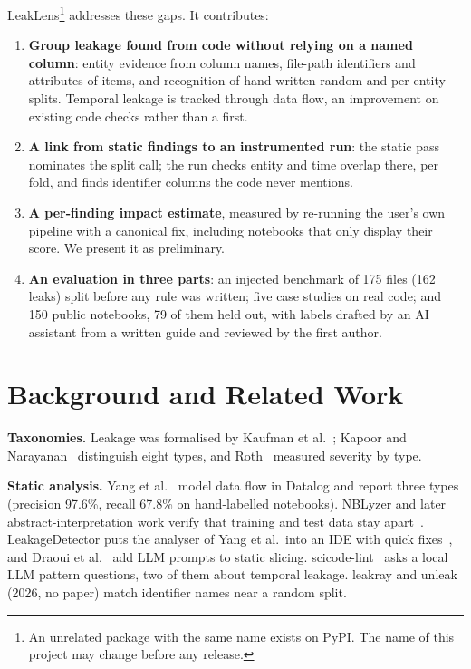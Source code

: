 \documentclass[conference]{IEEEtran}
\newcommand{\tool}{LeakLens}
\begin{document}
\tool{}\footnote{An unrelated package with the same name exists on PyPI. The name of this project may change
before any release.} addresses these gaps. It contributes:
\begin{enumerate}
\item \textbf{Group leakage found from code without relying on a named column}: entity evidence from column
names, file-path identifiers and attributes of items, and recognition of hand-written random and per-entity
splits. Temporal leakage is tracked through data flow, an improvement on existing code checks rather than a first.
\item \textbf{A link from static findings to an instrumented run}: the static pass nominates the split call; the
run checks entity and time overlap there, per fold, and finds identifier columns the code never mentions.
\item \textbf{A per-finding impact estimate}, measured by re-running the user's own pipeline with a canonical fix,
including notebooks that only display their score. We present it as preliminary.
\item \textbf{An evaluation in three parts}: an injected benchmark of 175 files (162 leaks) split before any rule
was written; five case studies on real code; and 150 public notebooks, 79 of them held out, with labels drafted
by an AI assistant from a written guide and reviewed by the first author.
\end{enumerate}

\section{Background and Related Work}

\textbf{Taxonomies.} Leakage was formalised by Kaufman et al.~\cite{kaufman2012}; Kapoor and
Narayanan~\cite{kapoor2023} distinguish eight types, and Roth~\cite{roth2026} measured severity by type.

\textbf{Static analysis.} Yang et al.~\cite{yang2022} model data flow in Datalog and report three types (precision
97.6\%, recall 67.8\% on hand-labelled notebooks). NBLyzer and later abstract-interpretation work verify that
training and test data stay apart~\cite{subotic2022a,subotic2022b,drobnjakovic2024}. LeakageDetector puts the
analyser of Yang et al.\ into an IDE with quick fixes~\cite{alomar2025,truong2025}, and Draoui et
al.~\cite{draoui2026} add LLM prompts to static slicing. scicode-lint~\cite{samsonau2026} asks a local LLM pattern
questions, two of them about temporal leakage. leakray and unleak~\cite{leakray,unleak} (2026, no paper) match identifier names near a random split.
\end{document}

